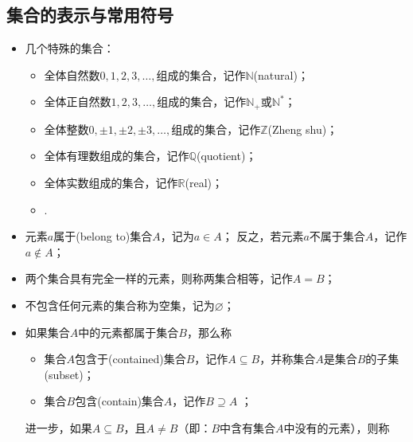   \subsection{集合的表示与常用符号}
    \begin{itemize}
      \item 几个特殊的集合：
        \begin{itemize}
          \item 全体{\fangsong 自然数}$0,1,2,3,\ldots ,$组成的集合，记作$\mathbb{N}$(natural)；
          \item 全体正自然数$1,2,3,\ldots ,$组成的集合，记作$\mathbb{N}_+$或$\mathbb{N}^*$；
          \item 全体{\fangsong 整数}$0,\pm1,\pm2,\pm3,\ldots ,$组成的集合，记作$\mathbb{Z}$(Zheng shu)；
          \item 全体{\fangsong 有理数}组成的集合，记作$\mathbb{Q}$(quotient)；
          \item 全体{\fangsong 实数}组成的集合，记作$\mathbb{R}$(real)；
          \item {}.
        \end{itemize}
      \item 元素$a${\fangsong 属于}(belong to)集合$A$，记为$a\in A$；
        反之，若元素$a${\fangsong 不属于}集合$A$，记作$a\notin A$；
        \\
      \item 两个集合具有完全一样的元素，则称两集合{\fangsong 相等}，记作$A=B$；
        \\
      \item 不包含任何元素的集合称为{\fangsong 空集}，记为$\varnothing$；
        \\
      \item 如果集合$A$中的元素都属于集合$B$，那么称
        \begin{itemize}
          \item 集合$A${\fangsong 包含于}(contained)集合$B$，记作$A\subseteq B$，并称集合$A$是集合$B$的{\fangsong 子集}(subset)；
          \item 集合$B${\fangsong 包含}(contain)集合$A$，记作$B\supseteq A$ ；
        \end{itemize}
        进一步，如果$A\subseteq B$，且$A\neq B$（即：$B$中含有集合$A$中没有的元素），则称
          \begin{itemize}

\end{itemize}
\end{itemize}

